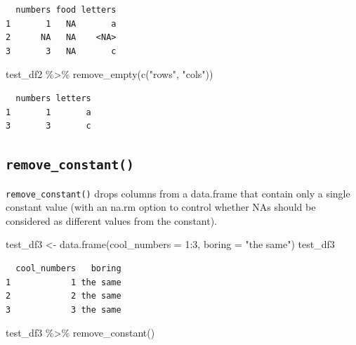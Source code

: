 \documentclass[
  letterpaper,
]{book}
\newenvironment{Shaded}{\begin{snugshade}}{\end{snugshade}}
\newcommand{\AttributeTok}[1]{\textcolor[rgb]{0.40,0.45,0.13}{#1}}
\newcommand{\DecValTok}[1]{\textcolor[rgb]{0.68,0.00,0.00}{#1}}
\newcommand{\FunctionTok}[1]{\textcolor[rgb]{0.28,0.35,0.67}{#1}}
\newcommand{\NormalTok}[1]{\textcolor[rgb]{0.00,0.23,0.31}{#1}}
\newcommand{\OtherTok}[1]{\textcolor[rgb]{0.00,0.23,0.31}{#1}}
\newcommand{\SpecialCharTok}[1]{\textcolor[rgb]{0.37,0.37,0.37}{#1}}
\newcommand{\StringTok}[1]{\textcolor[rgb]{0.13,0.47,0.30}{#1}}
\begin{document}
\begin{verbatim}
  numbers food letters
1       1   NA       a
2      NA   NA    <NA>
3       3   NA       c
\end{verbatim}

\begin{Shaded}
\begin{Highlighting}[]
\NormalTok{test\_df2 }\SpecialCharTok{\%\textgreater{}\%}
  \FunctionTok{remove\_empty}\NormalTok{(}\FunctionTok{c}\NormalTok{(}\StringTok{"rows"}\NormalTok{, }\StringTok{"cols"}\NormalTok{))}
\end{Highlighting}
\end{Shaded}

\begin{verbatim}
  numbers letters
1       1       a
3       3       c
\end{verbatim}

\hypertarget{remove_constant}{%
\subsection{\texorpdfstring{\texttt{remove\_constant()}}{remove\_constant()}}\label{remove_constant}}

\texttt{remove\_constant()} drops columns from a data.frame that contain
only a single constant value (with an na.rm option to control whether
NAs should be considered as different values from the constant).

\begin{Shaded}
\begin{Highlighting}[]
\NormalTok{test\_df3 }\OtherTok{\textless{}{-}} \FunctionTok{data.frame}\NormalTok{(}\AttributeTok{cool\_numbers =} \DecValTok{1}\SpecialCharTok{:}\DecValTok{3}\NormalTok{, }\AttributeTok{boring =} \StringTok{"the same"}\NormalTok{)}
\NormalTok{test\_df3}
\end{Highlighting}
\end{Shaded}

\begin{verbatim}
  cool_numbers   boring
1            1 the same
2            2 the same
3            3 the same
\end{verbatim}

\begin{Shaded}
\begin{Highlighting}[]
\NormalTok{test\_df3 }\SpecialCharTok{\%\textgreater{}\%} \FunctionTok{remove\_constant}\NormalTok{()}
\end{Highlighting}
\end{Shaded}
\end{document}
